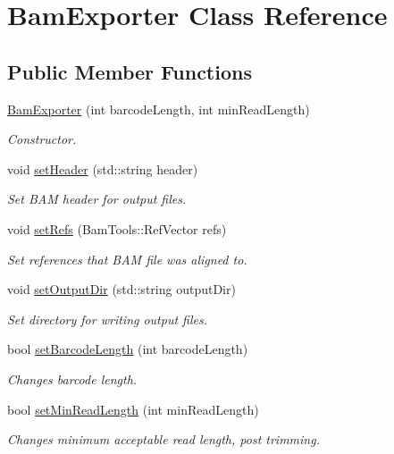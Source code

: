 \hypertarget{classBamExporter}{\section{Bam\-Exporter Class Reference}
\label{classBamExporter}
}
\subsection*{Public Member Functions}
\begin{DoxyCompactItemize}
\item 
\hyperlink{classBamExporter_a4aa0150613ccac4d289394cfbecf549a}{Bam\-Exporter} (int barcode\-Length, int min\-Read\-Length)
\begin{DoxyCompactList}\small\item\em Constructor. \end{DoxyCompactList}\item 
void \hyperlink{classBamExporter_a0ccdf2f047acc9428a657aacfbca97f1}{set\-Header} (std\-::string header)
\begin{DoxyCompactList}\small\item\em Set B\-A\-M header for output files. \end{DoxyCompactList}\item 
void \hyperlink{classBamExporter_a677b8c5352998f664dbe06c722accb33}{set\-Refs} (Bam\-Tools\-::\-Ref\-Vector refs)
\begin{DoxyCompactList}\small\item\em Set references that B\-A\-M file was aligned to. \end{DoxyCompactList}\item 
void \hyperlink{classBamExporter_ad5d5a62167c5d61d0cde3dc1bf2bf0d0}{set\-Output\-Dir} (std\-::string output\-Dir)
\begin{DoxyCompactList}\small\item\em Set directory for writing output files. \end{DoxyCompactList}\item 
bool \hyperlink{classBamExporter_ac16d3a4dde604a7d4ae0cdfecd656d71}{set\-Barcode\-Length} (int barcode\-Length)
\begin{DoxyCompactList}\small\item\em Changes barcode length. \end{DoxyCompactList}\item 
bool \hyperlink{classBamExporter_acf521439c031655b0d719a94f5e9092d}{set\-Min\-Read\-Length} (int min\-Read\-Length)
\begin{DoxyCompactList}\small\item\em Changes minimum acceptable read length, post trimming. \end{DoxyCompactList}\item 

\end{DoxyCompactItemize}
